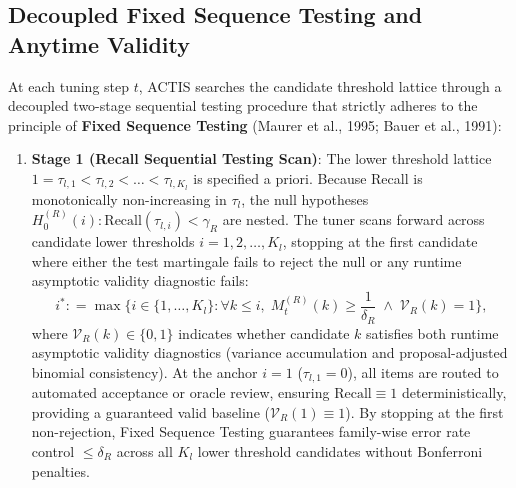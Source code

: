 \documentclass[11pt,a4paper]{article}
\newcommand{\coloneqq}{\mathrel{\mathop:}=}
\begin{document}
\subsection{Decoupled Fixed Sequence Testing and Anytime Validity}
At each tuning step $t$, ACTIS searches the candidate threshold lattice through a decoupled two-stage sequential testing procedure that strictly adheres to the principle of \textbf{Fixed Sequence Testing} (Maurer et al., 1995; Bauer et al., 1991):
\begin{enumerate}[leftmargin=*]
    \item \textbf{Stage 1 (Recall Sequential Testing Scan)}:
    The lower threshold lattice $1 = \tau_{l, 1} < \tau_{l, 2} < \dots < \tau_{l, K_l}$ is specified a priori. Because Recall is monotonically non-increasing in $\tau_l$, the null hypotheses $H_0^{(R)}(i): \text{Recall}(\tau_{l, i}) < \gamma_R$ are nested. The tuner scans forward across candidate lower thresholds $i = 1, 2, \dots, K_l$, stopping at the first candidate where either the test martingale fails to reject the null or any runtime asymptotic validity diagnostic fails:
    \begin{equation}\label{eq:fst_recall}
    i^* \coloneqq \max \Big\{ i \in \{1, \dots, K_l\} : \forall k \le i, \; M_t^{(R)}(k) \ge \frac{1}{\delta_R} \;\land\; \mathcal{V}_R(k) = 1 \Big\},
    \end{equation}
    where $\mathcal{V}_R(k) \in \{0, 1\}$ indicates whether candidate $k$ satisfies both runtime asymptotic validity diagnostics (variance accumulation and proposal-adjusted binomial consistency). At the anchor $i=1$ ($\tau_{l, 1} = 0$), all items are routed to automated acceptance or oracle review, ensuring $\text{Recall} \equiv 1$ deterministically, providing a guaranteed valid baseline ($\mathcal{V}_R(1) \equiv 1$). By stopping at the first non-rejection, Fixed Sequence Testing guarantees family-wise error rate control $\le \delta_R$ across all $K_l$ lower threshold candidates without Bonferroni penalties.
    

\end{enumerate}
\end{document}
